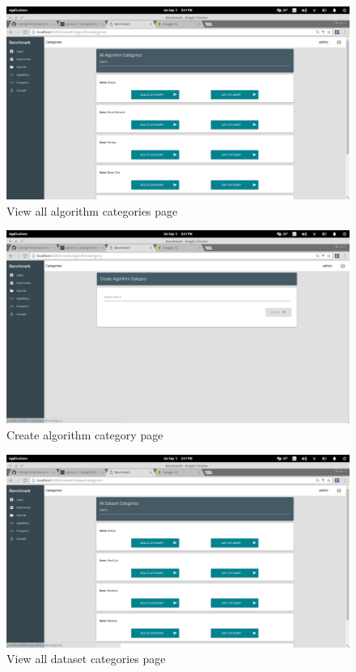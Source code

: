 \documentclass[11pt,a4paper]{article}
\begin{document}
\begin{figure}[H]
	\begin{center}
		\includegraphics[scale=0.3]{../Images/User Manual/View Algorithm Categories.png}
		\caption{View all algorithm categories page}
		\label{fig:viewAlCat}
	\end{center}  
\end{figure}
\begin{figure}[H]
	\begin{center}
		\includegraphics[scale=0.3]{../Images/User Manual/Create Algorithm Category.png}
		\caption{Create algorithm category page}
		\label{fig:createAlCat}
	\end{center}  
\end{figure}
\begin{figure}[H]
	\begin{center}
		\includegraphics[scale=0.3]{../Images/User Manual/View Dataset Categories.png}
		\caption{View all dataset categories page}
		\label{fig:viewDataCat}
	\end{center}  
\end{figure}
\end{document}
